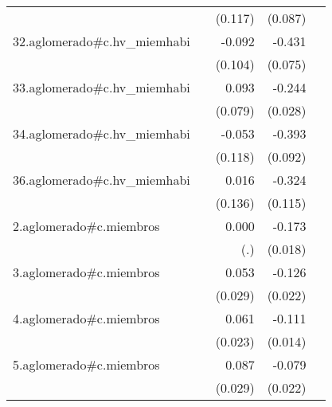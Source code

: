 {\begin{longtable}{l*{4}{D{.}{.}{-1}}}
            &                     &     (0.117)         &     (0.087)         &                     \\
\addlinespace
32.aglomerado#c.hv\_miemhabi&                     &      -0.092         &      -0.431\sym{***}&                     \\
            &                     &     (0.104)         &     (0.075)         &                     \\
\addlinespace
33.aglomerado#c.hv\_miemhabi&                     &       0.093         &      -0.244\sym{***}&                     \\
            &                     &     (0.079)         &     (0.028)         &                     \\
\addlinespace
34.aglomerado#c.hv\_miemhabi&                     &      -0.053         &      -0.393\sym{***}&                     \\
            &                     &     (0.118)         &     (0.092)         &                     \\
\addlinespace
36.aglomerado#c.hv\_miemhabi&                     &       0.016         &      -0.324\sym{**} &                     \\
            &                     &     (0.136)         &     (0.115)         &                     \\
\addlinespace
2.aglomerado#c.miembros&                     &       0.000         &      -0.173\sym{***}&                     \\
            &                     &         (.)         &     (0.018)         &                     \\
\addlinespace
3.aglomerado#c.miembros&                     &       0.053         &      -0.126\sym{***}&                     \\
            &                     &     (0.029)         &     (0.022)         &                     \\
\addlinespace
4.aglomerado#c.miembros&                     &       0.061\sym{**} &      -0.111\sym{***}&                     \\
            &                     &     (0.023)         &     (0.014)         &                     \\
\addlinespace
5.aglomerado#c.miembros&                     &       0.087\sym{**} &      -0.079\sym{***}&                     \\
            &                     &     (0.029)         &     (0.022)         &                     \\

\end{longtable}}
